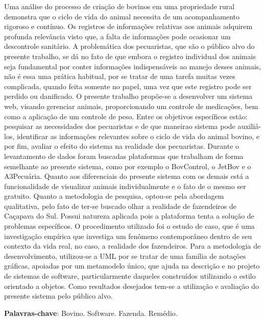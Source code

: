 %
%

\begin{RESUMO}
\thispagestyle{empty}
	\begin{SingleSpace}

		\hspace{-1.2 cm}  Uma análise do processo de criação de bovinos em uma propriedade rural demonstra que o ciclo de vida do
		animal necessita de um acompanhamento rigoroso e contínuo. Os registros de informações relativas aos animais adquirem
		profunda relevância visto que, a falta de informações pode ocasionar um descontrole sanitário. A problemática dos pecuaristas,
		que são o público alvo do presente trabalho, se dá no fato de que embora o registro individual dos animais seja fundamental
		por conter informações indispensáveis ao manejo desses animais, não é essa uma prática habitual, por se tratar de uma tarefa
		muitas vezes complicada, quando feita somente no papel, uma vez que este registro pode ser perdido ou danificado. O presente
		trabalho propõe-se a desenvolver um sistema web, visando gerenciar animais, proporcionando um controle de medicações, bem
		como a aplicação de um controle de peso. Entre os objetivos específicos estão: pesquisar as necessidades dos pecuaristas
		e de que maneirao sistema pode auxiliá-los, identificar as informações relevantes sobre o ciclo de vida do animal bovino, e por fim,
		avaliar o efeito do sistema na realidade dos pecuaristas. Durante o levantamento de dados foram buscadas plataformas que trabalham
		de forma semelhante ao presente sistema, como por exemplo o BovControl, o JetBov e o A3Pecuária. Quanto aos diferenciais do
		presente sistema com os demais está a funcionalidade de visualizar animais individualmente e o fato de o mesmo ser gratuito.
		Quanto a metodologia de pesquisa, optou-se pela abordagem qualitativa, pelo fato
		de ter-se buscado olhar a realidade de fazendeiros de Caçapava do Sul. Possui natureza aplicada pois a plataforma tenta a
		solução de problemas específicos. O procedimento utilizado foi o estudo de caso, que é uma investigação empírica que
		investiga um fenômeno contemporâneo dentro de seu contexto da vida real, no caso, a realidade dos fazendeiros. Para a
		metodologia de desenvolvimento, utilizou-se a UML por se tratar de uma família de notações gráficas, apoiadas por um
		metamodelo único, que ajuda na descrição e no projeto de sistemas de software, particularmente daqueles construídos
		utilizando o estilo orientado a objetos. Como resultados desejados tem-se a utilização e avaliação do presente sistema
		pelo público alvo.

		\vspace*{0.5cm}\hspace{-1.3 cm}\textbf{Palavras-chave}: Bovino. Software. Fazenda. Remédio.



	\end{SingleSpace}
\end{RESUMO}
